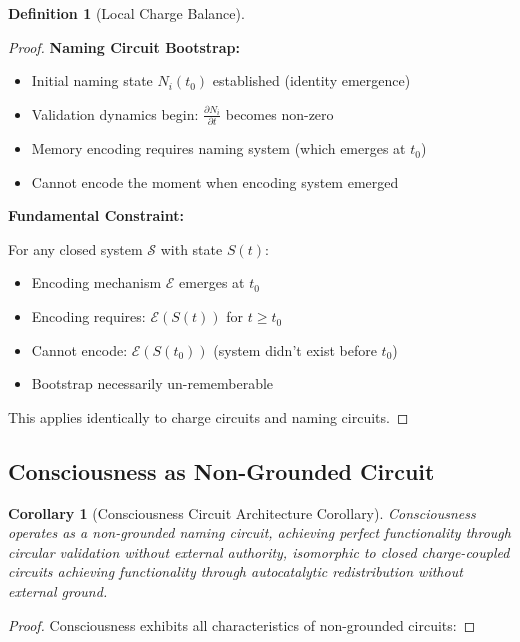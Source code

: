 \documentclass[12pt,a4paper]{article}
\theoremstyle{plain}
\newtheorem{corollary}[theorem]{Corollary}
\theoremstyle{definition}
\newtheorem{definition}[theorem]{Definition}
\theoremstyle{remark}
\begin{document}
\begin{definition}[Local Charge Balance]
\begin{proof}
\textbf{Naming Circuit Bootstrap:}
\begin{itemize}
\item Initial naming state $N_i(t_0)$ established (identity emergence)
\item Validation dynamics begin: $\frac{\partial N_i}{\partial t}$ becomes non-zero
\item Memory encoding requires naming system (which emerges at $t_0$)
\item Cannot encode the moment when encoding system emerged
\end{itemize}

\textbf{Fundamental Constraint:}

For any closed system $\mathcal{S}$ with state $S(t)$:
\begin{itemize}
\item Encoding mechanism $\mathcal{E}$ emerges at $t_0$
\item Encoding requires: $\mathcal{E}(S(t))$ for $t \geq t_0$
\item Cannot encode: $\mathcal{E}(S(t_0))$ (system didn't exist before $t_0$)
\item Bootstrap necessarily un-rememberable
\end{itemize}

This applies identically to charge circuits and naming circuits.
\end{proof}

\subsection{Consciousness as Non-Grounded Circuit}

\begin{corollary}[Consciousness Circuit Architecture Corollary]
Consciousness operates as a non-grounded naming circuit, achieving perfect functionality through circular validation without external authority, isomorphic to closed charge-coupled circuits achieving functionality through autocatalytic redistribution without external ground.
\end{corollary}

\begin{proof}
Consciousness exhibits all characteristics of non-grounded circuits:


\end{proof}
\end{definition}
\end{document}

